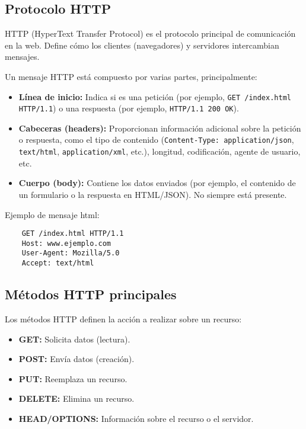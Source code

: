 \documentclass[11pt,a4paper]{article}
\begin{document}
    \subsection{Protocolo HTTP}
    HTTP (HyperText Transfer Protocol) es el protocolo principal de comunicación en la web. Define cómo los clientes (navegadores) y servidores intercambian mensajes.

    Un mensaje HTTP está compuesto por varias partes, principalmente:

    \begin{itemize}
        \item \textbf{Línea de inicio:} Indica si es una petición (por ejemplo, \texttt{GET /index.html HTTP/1.1}) o una respuesta (por ejemplo, \texttt{HTTP/1.1 200 OK}).
        \item \textbf{Cabeceras (headers):} Proporcionan información adicional sobre la petición o respuesta, como el tipo de contenido (\texttt{Content-Type: application/json}, \texttt{text/html}, \texttt{application/xml}, etc.), longitud, codificación, agente de usuario, etc.
        \item \textbf{Cuerpo (body):} Contiene los datos enviados (por ejemplo, el contenido de un formulario o la respuesta en HTML/JSON). No siempre está presente.
    \end{itemize}

    Ejemplo de mensaje html:
    \begin{verbatim}
    GET /index.html HTTP/1.1
    Host: www.ejemplo.com
    User-Agent: Mozilla/5.0
    Accept: text/html
    \end{verbatim}

    \subsection{Métodos HTTP principales}

    Los métodos HTTP definen la acción a realizar sobre un recurso:

    \begin{itemize}
        \item \textbf{GET:} Solicita datos (lectura).
        \item \textbf{POST:} Envía datos (creación).
        \item \textbf{PUT:} Reemplaza un recurso.
        \item \textbf{DELETE:} Elimina un recurso.
        \item \textbf{HEAD/OPTIONS:} Información sobre el recurso o el servidor.
    \end{itemize}
\end{document}
